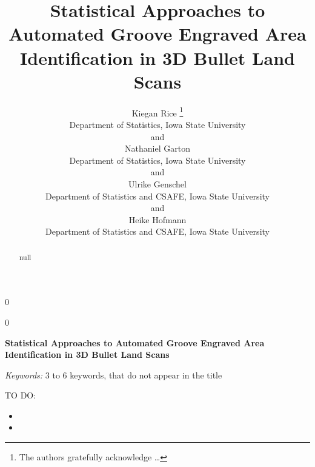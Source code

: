 \documentclass[12pt]{article}
\newcommand{\blind}{0}
\begin{document}
\def\spacingset#1{\renewcommand{\baselinestretch}%
{#1}\small\normalsize} \spacingset{1}




\blind
{
  \title{\bf Statistical Approaches to Automated Groove Engraved Area Identification
in 3D Bullet Land Scans}

  \author{
        Kiegan Rice \thanks{The authors gratefully acknowledge \ldots{}} \\
    Department of Statistics, Iowa State University\\
     and \\     Nathaniel Garton \\
    Department of Statistics, Iowa State University\\
     and \\     Ulrike Genschel \\
    Department of Statistics and CSAFE, Iowa State University\\
     and \\     Heike Hofmann \\
    Department of Statistics and CSAFE, Iowa State University\\
      }
  \maketitle
} \fi

\blind
{
  \bigskip
  \bigskip
  \bigskip
  \begin{center}
    {\LARGE\bf Statistical Approaches to Automated Groove Engraved Area Identification
in 3D Bullet Land Scans}
  \end{center}
  \medskip
} \fi

\bigskip
\begin{abstract}
null
\end{abstract}

\noindent%
{\it Keywords:} 3 to 6 keywords, that do not appear in the title
\vfill

\newpage
\spacingset{1.45} %

\newcommand{\hh}[1]{{\color{orange}{#1}}}
\newcommand{\kr}[1]{{\color{teal}{#1}}}
\newcommand{\ug}[1]{{\color{purple}{#1}}}
\newcommand{\nate}[1]{{\color{olive}{#1}}}

TO DO:

\begin{itemize}
\item
  {\color{teal}{Abstract}}
\item
  {\color{teal}{Time to calculate for BCP}}
\end{itemize}
\end{document}
